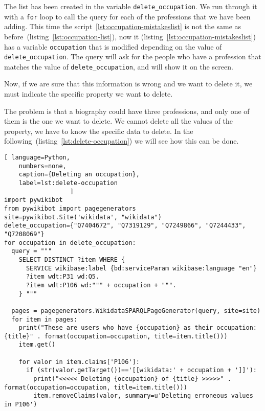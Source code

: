 The list has been created in the variable \lstinline|delete_occupation|. 
We run through it with a \lstinline|for| loop 
to call the query for each of the professions that we have been adding. 
This time the script~\ref{lst:occupation-mistakeslist} is not the same 
as before~(listing~\ref{lst:occupation-list}), 
now it (listing~\ref{lst:occupation-mistakeslist}) has a variable \lstinline|occupation| 
that is modified depending on the value of \lstinline|delete_occupation|. 
The query will ask for the people who have a profession 
that matches the value of \lstinline|delete_occupation|, and will show it on the screen.

Now, if we are sure that this information is wrong and we want to delete it, we must indicate the specific property we want to delete.

The problem is that a biography could have three professions, and only one of them is the one we want to delete. We cannot delete all the values of the property, we have to know the specific data to delete. In the following~(listing~\ref{lst:delete-occupation}) we will see how this can be done. 

\begin{widepar}%
	\captionsetup[lstlisting]{%
        format=llapwide16 %
	}%
\begin{lstlisting}[ language=Python,
    numbers=none,
    caption={Deleting an occupation},
    label=lst:delete-occupation
                  ]
import pywikibot
from pywikibot import pagegenerators
site=pywikibot.Site('wikidata', "wikidata")
delete_occupation={"Q7404672", "Q7319129", "Q7249866", "Q7244433", 
"Q7208069"}
for occupation in delete_occupation:
  query = """
    SELECT DISTINCT ?item WHERE {
      SERVICE wikibase:label {bd:serviceParam wikibase:language "en"}
      ?item wdt:P31 wd:Q5.
      ?item wdt:P106 wd:""" + occupation + """.
    } """

  pages = pagegenerators.WikidataSPARQLPageGenerator(query, site=site)
  for item in pages:
    print("These are users who have {occupation} as their occupation: {title}" . format(occupation=occupation, title=item.title()))
    item.get()

    for valor in item.claims['P106']:
      if (str(valor.getTarget())=='[[wikidata:' + occupation + ']]'):
        print("<<<<< Deleting {occupation} of {title} >>>>>" . format(occupation=occupation, title=item.title()))
        item.removeClaims(valor, summary=u'Deleting erroneous values in P106')
\end{lstlisting}%
\end{widepar}%

